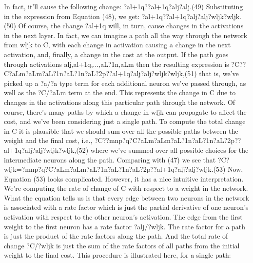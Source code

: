 In fact, it'll cause the following change: 
?al+1q??al+1q?alj?alj.(49)
Substituting in the expression from Equation (48), we get: 
?al+1q??al+1q?alj?alj?wljk?wljk.(50)
Of course, the change ?al+1q will, in turn, cause changes in the activations in the next layer. In fact, we can imagine a path all the way through the network from wljk to C, with each change in activation causing a change in the next activation, and, finally, a change in the cost at the output. If the path goes through activations alj,al+1q,$\ldots$,aL?1n,aLm then the resulting expression is 
?C??C?aLm?aLm?aL?1n?aL?1n?aL?2p??al+1q?alj?alj?wljk?wljk,(51)
that is, we've picked up a ?a/?a type term for each additional neuron we've passed through, as well as the ?C/?aLm term at the end. This represents the change in C due to changes in the activations along this particular path through the network. Of course, there's many paths by which a change in wljk can propagate to affect the cost, and we've been considering just a single path. To compute the total change in C it is plausible that we should sum over all the possible paths between the weight and the final cost, i.e., 
?C??mnp?q?C?aLm?aLm?aL?1n?aL?1n?aL?2p??al+1q?alj?alj?wljk?wljk,(52)
where we've summed over all possible choices for the intermediate neurons along the path. Comparing with (47) we see that 
?C?wljk=?mnp?q?C?aLm?aLm?aL?1n?aL?1n?aL?2p??al+1q?alj?alj?wljk.(53)
Now, Equation (53) looks complicated. However, it has a nice intuitive interpretation. We're computing the rate of change of C with respect to a weight in the network. What the equation tells us is that every edge between two neurons in the network is associated with a rate factor which is just the partial derivative of one neuron's activation with respect to the other neuron's activation. The edge from the first weight to the first neuron has a rate factor ?alj/?wljk. The rate factor for a path is just the product of the rate factors along the path. And the total rate of change ?C/?wljk is just the sum of the rate factors of all paths from the initial weight to the final cost. This procedure is illustrated here, for a single path: 

